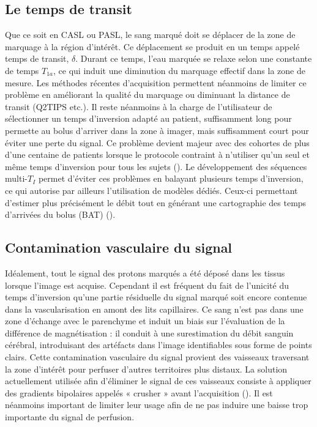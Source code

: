 \subsection{Le temps de transit}
Que ce soit en CASL ou PASL, le sang marqué doit se déplacer de la zone de marquage à la
région d’intérêt. Ce déplacement se produit en un temps appelé temps de transit, $\delta$. Durant ce temps,
l’eau marquée se relaxe selon une constante de temps $T_{1a}$, ce qui induit une diminution du marquage
effectif dans la zone de mesure. Les méthodes récentes d’acquisition permettent néanmoins de limiter
ce problème en améliorant la qualité du marquage ou diminuant la distance de transit (Q2TIPS etc.). Il
reste néanmoins à la charge de l’utilisateur de sélectionner un temps d’inversion adapté au patient,
suffisamment long pour permette au bolus d’arriver dans la zone à imager, mais suffisamment court
pour éviter une perte du signal. Ce problème devient majeur avec des cohortes de plus d’une centaine
de patients lorsque le protocole contraint à n’utiliser qu’un seul et même temps d’inversion pour tous
les sujets (\cite{Deverdun2015}). Le développement des séquences multi-$T_I$ permet d’éviter ces problèmes en balayant
plusieurs temps d’inversion, ce qui autorise par ailleurs l’utilisation de modèles dédiés. Ceux-ci
permettant d’estimer plus précisément le débit tout en générant une cartographie des temps
d’arrivées du bolus (BAT) (\cite{Chappell2009}).
\subsection{Contamination vasculaire du signal}
Idéalement, tout le signal des protons marqués a été déposé dans les tissus lorsque l’image est
acquise. Cependant il est fréquent du fait de l’unicité du temps d’inversion qu’une partie résiduelle du
signal marqué soit encore contenue dans la vascularisation en amont des lits capillaires. Ce sang n’est
pas dans une zone d’échange avec le parenchyme et induit un biais sur l’évaluation de la différence de
magnétisation : il conduit à une surestimation du débit sanguin cérébral, introduisant des artéfacts
dans l’image identifiables sous forme de points clairs. Cette contamination vasculaire du signal
provient des vaisseaux traversant la zone d’intérêt pour perfuser d’autres territoires plus distaux. La
solution actuellement utilisée afin d’éliminer le signal de ces vaisseaux consiste à appliquer des
gradients bipolaires appelés « crusher » avant l’acquisition (\cite{Ye1997}). Il est néanmoins important de limiter
leur usage afin de ne pas induire une baisse trop importante du signal de perfusion.

